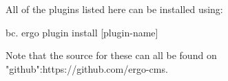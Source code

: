 All of the plugins listed here can be installed using:

bc. ergo plugin install [plugin-name]

Note that the source for these can all be found on "github":https://github.com/ergo-cms.
